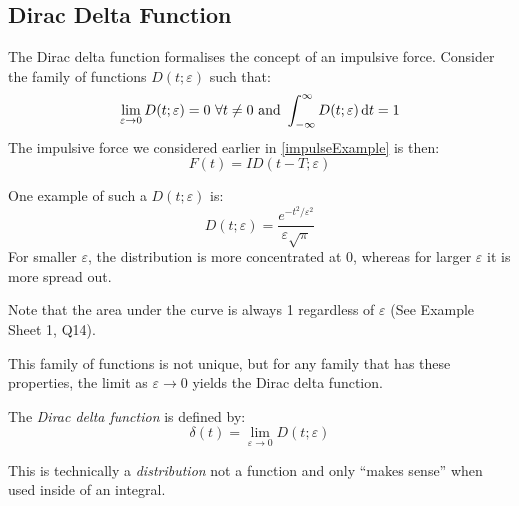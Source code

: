 \documentclass[../main.tex]{subfiles}
\begin{document}
\subsection{Dirac Delta Function}
The Dirac delta function formalises the concept of an impulsive force.
Consider the family of functions $D(t; \varepsilon)$ such that:
\[
  \lim_{\varepsilon \to 0} D(t; \varepsilon) = 0\ \forall t \neq0 \text{ and } \int_{-\infty}^{\infty} D(t; \varepsilon) \d{t} = 1
\]
The impulsive force we considered earlier in \cref{impulseExample} is then:
\[
  F(t) = ID(t - T; \varepsilon)
\]

One example of such a $D(t; \varepsilon)$ is:
\[
  D(t;\varepsilon) = \frac{e^{-t^2/\varepsilon^2}}{\varepsilon\sqrt{\pi}}
\]
For smaller $\varepsilon$, the distribution is more concentrated at 0, whereas for larger $\varepsilon$ it is more spread out.
\begin{center}
\end{center}
Note that the area under the curve is always 1 regardless of $\varepsilon$ (See Example Sheet 1, Q14).

This family of functions is not unique, but for any family that has these properties, the limit as $\varepsilon \to 0$ yields the Dirac delta function.
\begin{definition}
  The \textit{Dirac delta function} is defined by:
  \[
    \delta(t) = \lim_{\varepsilon \to 0} D(t; \varepsilon)
  \]
\end{definition}
\begin{remark}[Note]
  This is technically a \textit{distribution} not a function and only ``makes sense'' when used inside of an integral.
\end{remark}
\end{document}
